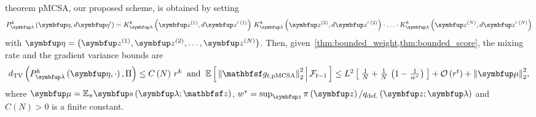 
\begin{theoremEnd}{theorem}\label{thm:pmcsa}
  pMCSA, our proposed scheme, is obtained by setting
  {%
  \begin{align*}
    P_{\vlambda}^k\left(\veta, d\veta^{\prime}\right)
    = 
    K_{\vlambda}^k\left(\vz^{(1)}, d\vz^{\prime\; (1)}\right)
    \,
    K_{\vlambda}^k\left(\vz^{(2)}, d\vz^{\prime\; (2)}\right)
    \cdot
    \ldots 
    \cdot
    K_{\vlambda}^k\left(\vz^{(N)}, d\vz^{\prime\; (N)}\right)
  \end{align*}
  }
  with \(\veta = \left(\vz^{(1)}, \vz^{(2)}, \ldots, \vz^{(N)}\right)\).
  Then, given~\cref{thm:bounded_weight,thm:bounded_score}, the mixing rate and the gradient variance bounds are
  {\small
  \begin{align*}
    \textstyle
    \DTV{P_{\vlambda}^k\left(\veta, \cdot\right)}{\Pi}
    \leq
    C\left(N\right)\,{r^k}
    \;\;\text{and}\;\;
    \E{ {\lVert\rvvg_{t,\mathrm{pMCSA}}\rVert}^2_2 \,\middle|\, \mathcal{F}_{t-1} }
    \leq
    L^2 \left[\; \frac{1}{N} + \frac{1}{N}\,\left(1 - \frac{1}{w^*}\right) \;\right]
    +
    \mathcal{O}\left(r^{t}\right)
    +
    {\lVert\vmu\rVert}^2_2,
  \end{align*}
  }%
  where
  \(\vmu = \mathbb{E}_{\pi}\vs\left(\vlambda;\rvvz\right)\), 
  \(w^* = \sup_{\vz} \pi\left(\vz\right) / q_{\text{def.}}\left(\vz;\vlambda\right)\) and \(C\left(N\right) > 0\) is a finite constant.
\end{theoremEnd}
